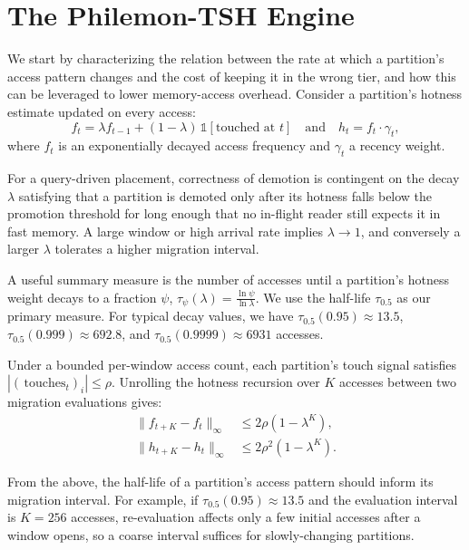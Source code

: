 \documentclass{article}
\begin{document}
\section{The Philemon-TSH Engine}
\label{sec:system}

We start by characterizing the relation between the rate at which a partition's
access pattern changes and the cost of keeping it in the wrong tier, and how this can
be leveraged to lower memory-access overhead. Consider a partition's hotness estimate
updated on every access:
\begin{equation}
f_t = \lambda f_{t-1} + (1 - \lambda)\,\mathbb{1}[\text{touched at } t]
\quad \text{and} \quad
h_t = f_t \cdot \gamma_t,
\end{equation}
where $f_t$ is an exponentially decayed access frequency and $\gamma_t$ a recency
weight.

For a query-driven placement, correctness of demotion is contingent on the decay
$\lambda$ satisfying that a partition is demoted only after its hotness falls below
the promotion threshold for long enough that no in-flight reader still expects it in
fast memory. A large window or high arrival rate implies $\lambda \to 1$, and
conversely a larger $\lambda$ tolerates a higher migration interval.

A useful summary measure is the number of accesses until a partition's hotness weight
decays to a fraction $\psi$, $\tau_\psi(\lambda) = \frac{\ln \psi}{\ln \lambda}$. We
use the half-life $\tau_{0.5}$ as our primary measure. For typical decay values, we
have $\tau_{0.5}(0.95) \approx 13.5$, $\tau_{0.5}(0.999) \approx 692.8$, and
$\tau_{0.5}(0.9999) \approx 6931$ accesses.

Under a bounded per-window access count, each partition's touch signal satisfies
$|(\,\text{touches}_t)_i| \leq \rho$. Unrolling the hotness recursion over $K$ accesses
between two migration evaluations gives:
\begin{align}
\|f_{t+K} - f_t\|_\infty &\leq 2\rho(1 - \lambda^K), \\
\|h_{t+K} - h_t\|_\infty &\leq 2\rho^2(1 - \lambda^K).
\end{align}

From the above, the half-life of a partition's access pattern should inform its
migration interval. For example, if $\tau_{0.5}(0.95) \approx 13.5$ and the
evaluation interval is $K = 256$ accesses, re-evaluation affects only a few initial
accesses after a window opens, so a coarse interval suffices for slowly-changing
partitions.
\end{document}
